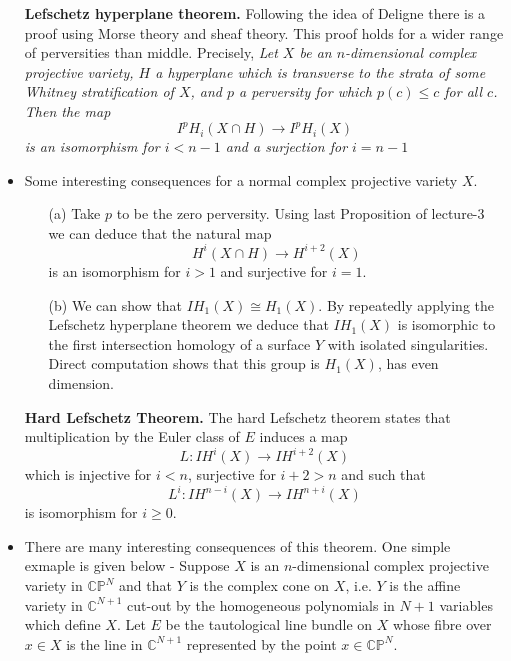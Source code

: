 \documentclass[11pt]{article}
\begin{document}
\begin{itemize}
    \item[] \textbf{Lefschetz hyperplane theorem.} Following the idea of Deligne there is a proof using Morse theory and sheaf theory. This proof holds for a wider range of perversities than middle. Precisely, \textit{ Let $X$ be an $n$-dimensional complex projective variety, $H$ a hyperplane which is transverse to the strata of some Whitney stratification of $X$, and $p$ a perversity for which $p(c) \leq c$ for all $c$. Then the map $$
    I^p H_i(X \cap H) \rightarrow I^p H_i(X)
    $$
    is an isomorphism for $i<n-1$ and a surjection for $i=n-1$}
    \item Some interesting consequences for a normal complex projective variety $X$.
    \begin{itemize}
        \item[(a)] Take $p$ to be the zero perversity. Using last Proposition of lecture-3 we can deduce that the natural map
        $$
        H^i(X \cap H) \rightarrow H^{i+2}(X)
        $$
        is an isomorphism for $i>1$ and surjective for $i=1$. 
        \item[(b)] We can show that $I H_1(X) \cong H_1(X)$. By repeatedly applying the Lefschetz hyperplane theorem we deduce that $I H_1(X)$ is isomorphic to the first intersection homology of a surface $Y$ with isolated singularities. Direct computation shows that this group is $H_1(X)$, has even dimension.
    \end{itemize}
 \item[] \textbf{Hard Lefschetz Theorem.} The hard Lefschetz theorem states that multiplication by the Euler class of $E$ induces a map
 $$
 L: I H^i(X) \rightarrow I H^{i+2}(X)
 $$
 which is injective for $i<n$, surjective for $i+2>n$ and such that
 $$
 L^i: I H^{n-i}(X) \rightarrow I H^{n+i}(X)
 $$ is isomorphism for $i \geq 0$.
 \item There are many interesting consequences of this theorem. One simple exmaple is given below - Suppose $X$ is an $n$-dimensional complex projective variety in $\mathbb{C P}^N$ and that $Y$ is the complex cone on $X$, i.e. $Y$ is the affine variety in $\mathbb{C}^{N+1}$ cut-out by the homogeneous polynomials in $N+1$ variables which define $X$. Let $E$ be the tautological line bundle on $X$ whose fibre over $x \in X$ is the line in $\mathbb{C}^{N+1}$ represented by the point $x \in \mathbb{C P}^N$.


\end{itemize}
\end{document}
